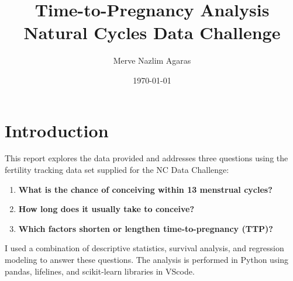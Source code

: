 \documentclass[11pt,a4paper]{article}
\title{Time-to-Pregnancy Analysis\\
\large Natural Cycles Data Challenge }
\author{Merve Nazlim Agaras}
\date{\today}
\begin{document}
\maketitle

\tableofcontents
\newpage
\section{Introduction}
This report explores the data provided and addresses three questions using the fertility tracking data set supplied for the NC Data Challenge:

\begin{enumerate}
  \item \textbf{What is the chance of conceiving within 13 menstrual cycles?}
  \item \textbf{How long does it usually take to conceive?}
  \item \textbf{Which factors shorten or lengthen time-to-pregnancy (TTP)?}
\end{enumerate}
I used a combination of descriptive statistics, survival analysis, and regression modeling to answer these questions. The analysis is performed in Python using pandas, lifelines, and scikit-learn libraries in VScode.
\end{document}
